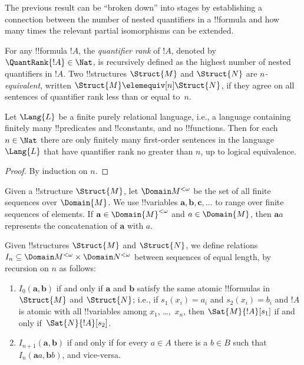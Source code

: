 \documentclass[../../include/open-logic-section]{subfiles}
\begin{document}
The previous result can be ``broken down'' into stages by establishing a
connection between the number of nested quantifiers in a !!{formula} and
how many times the relevant partial isomorphisms can be extended.

\begin{defn}
  For any !!{formula} $!A$, the \emph{quantifier rank} of $!A$, denoted
  by $\QuantRank{!A} \in \Nat$, is recursively defined as
  the highest number of nested quantifiers in $!A$.  Two
  !!{structure}s $\Struct{M}$ and $\Struct{N}$ are \emph{$n$-equivalent},
  written $\Struct{M} \elemequiv[n] \Struct{N}$, if they agree on all
  sentences of quantifier rank less than or equal to~$n$.
\end{defn}

\begin{prop}
  Let $\Lang{L}$ be a finite purely relational language, i.e., a
  language containing finitely many !!{predicate}s and !!{constant}s,
  and no !!{function}s. Then for each $n \in \Nat$ there are
  only finitely many first-order sentences in the language
  $\Lang{L}$ that have quantifier rank no greater than $n$, up to
  logical equivalence.
\end{prop}

\begin{proof}
  By induction on $n$.
\end{proof}

\begin{defn}
  Given a !!{structure} $\Struct{M}$, let $\Domain M^{<\omega}$ be the set of
  all finite sequences over $\Domain{M}$. We use !!{variable}s $\mathbf{a},
  \mathbf{b}, \mathbf{c}, \ldots$ to range over finite sequences of
  elements. If $\mathbf{a} \in \Domain{M}^{<\omega}$ and $a \in \Domain{M}$, then
  $\mathbf{a}a$ represents the concatenation of $\mathbf{a}$ with $a$.
\end{defn}

\begin{defn}
  Given !!{structure}s $\Struct{M}$ and $\Struct{N}$, we define
  relations $I_n \subseteq \Domain M^{<\omega} \times \Domain N^{<\omega}$ between
  sequences of equal length, by recursion on $n$ as follows:
   \begin{enumerate}
   \item $I_0(\mathbf{a},\mathbf{b})$ if and only if $\mathbf{a}$ and
     $\mathbf{b}$ satisfy the same atomic !!{formula}s in  $\Struct{M}$
     and  $\Struct{N}$; i.e., if $s_1(x_i) = a_i$ and $s_2(x_i) =
     b_i$ and $!A$ is atomic with all !!{variable}s among
     $x_1$, \dots,~$x_n$, then $\Sat{M}{!A}[s_1]$ if and
     only if~$\Sat{N}{!A}[s_2]$.
   \item $I_{n+1} (\mathbf{a},\mathbf{b})$ if and only if for every
     $a\in A$ there is a $b\in B$ such that $I_n
     (\mathbf{a}a,\mathbf{b}b)$, and vice-versa.
   \end{enumerate}
\end{defn}
\end{document}
